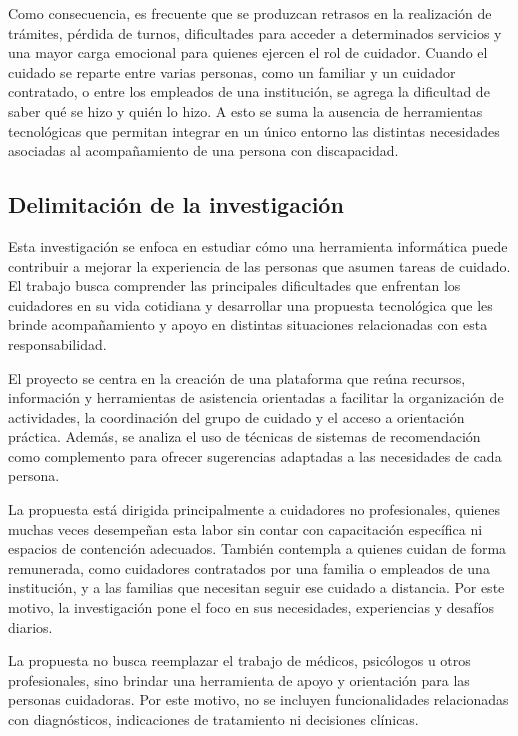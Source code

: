 Como consecuencia, es frecuente que se produzcan retrasos en la realización de trámites, pérdida de turnos, dificultades para acceder a determinados servicios y una mayor carga emocional para quienes ejercen el rol de cuidador. Cuando el cuidado se reparte entre varias personas, como un familiar y un cuidador contratado, o entre los empleados de una institución, se agrega la dificultad de saber qué se hizo y quién lo hizo. A esto se suma la ausencia de herramientas tecnológicas que permitan integrar en un único entorno las distintas necesidades asociadas al acompañamiento de una persona con discapacidad.

\subsection{Delimitación de la investigación}

Esta investigación se enfoca en estudiar cómo una herramienta informática puede contribuir a mejorar la experiencia de las personas que asumen tareas de cuidado. El trabajo busca comprender las principales dificultades que enfrentan los cuidadores en su vida cotidiana y desarrollar una propuesta tecnológica que les brinde acompañamiento y apoyo en distintas situaciones relacionadas con esta responsabilidad.

El proyecto se centra en la creación de una plataforma que reúna recursos, información y herramientas de asistencia orientadas a facilitar la organización de actividades, la coordinación del grupo de cuidado y el acceso a orientación práctica. Además, se analiza el uso de técnicas de sistemas de recomendación como complemento para ofrecer sugerencias adaptadas a las necesidades de cada persona.

La propuesta está dirigida principalmente a cuidadores no profesionales, quienes muchas veces desempeñan esta labor sin contar con capacitación específica ni espacios de contención adecuados. También contempla a quienes cuidan de forma remunerada, como cuidadores contratados por una familia o empleados de una institución, y a las familias que necesitan seguir ese cuidado a distancia. Por este motivo, la investigación pone el foco en sus necesidades, experiencias y desafíos diarios.

La propuesta no busca reemplazar el trabajo de médicos, psicólogos u otros profesionales, sino brindar una herramienta de apoyo y orientación para las personas cuidadoras. Por este motivo, no se incluyen funcionalidades relacionadas con diagnósticos, indicaciones de tratamiento ni decisiones clínicas.


